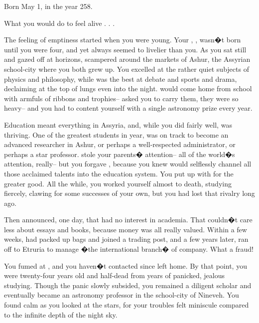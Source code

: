 \documentclass[char]{Kos}
\begin{document}
\name{\cAnarchist{}}

Born May 1, in the year 258.

What you would do to feel alive . . .

The feeling of emptiness started when you were young. Your \cMerchant{\sibling}, \cMerchant{\nickname}, wasn�t born until you were four, and yet \cMerchant{\they} always seemed to livelier than you. As you sat still and gazed off at horizons, \cMerchant{\they} scampered around the markets of Ashur, the Assyrian school-city where you both grew up. You excelled at the rather quiet subjects of physics and philosophy, while \cMerchant{\they} was the best at debate and sports and drama, declaiming at the top of \cMerchant{\their} lungs even into the night. \cMerchant{\They} would come home from school with armfuls of ribbons and trophies-- \cMerchant{\they} asked you to carry them, they were so heavy-- and you had to content yourself with a single astronomy prize every year.

Education meant everything in Assyria, and, while you did fairly well, \cMerchant{\nickname} was thriving. One of the greatest students in \cMerchant{\their} year, \cMerchant{\they} was on track to become an advanced researcher in Ashur, or perhaps a well-respected administrator, or perhaps a star professor. \cMerchant{\They} stole your parents� attention-- all of the world�s attention, really-- but you forgave \cMerchant{\them}, because you knew \cMerchant{\they} would selflessly channel all those acclaimed talents into the education system. You put up with \cMerchant{\them} for the greater good. All the while, you worked yourself almost to death, studying fiercely, clawing for some successes of your own, but you had lost that rivalry long ago.

Then \cMerchant{\they} announced, one day, that \cMerchant{\they} had no interest in academia. That \cMerchant{\they} couldn�t care less about essays and books, because money was all \cMerchant{\they} really valued. Within a few weeks, \cMerchant{\they} had packed up \cMerchant{\their} bags and joined a trading post, and a few years later, \cMerchant{\they} ran off to Etruria to manage �the international branch� of \cMerchant{\their} company. What a fraud!

You fumed at \cMerchant{\them}, and you haven�t contacted \cMerchant{\them} since \cMerchant{\they} left home. By that point, you were twenty-four years old and half-dead from years of panicked, jealous studying. Though the panic slowly subsided, you remained a diligent scholar and eventually became an astronomy professor in the school-city of Nineveh. You found calm as you looked at the stars, for your troubles felt miniscule compared to the infinite depth of the night sky.
\end{document}
